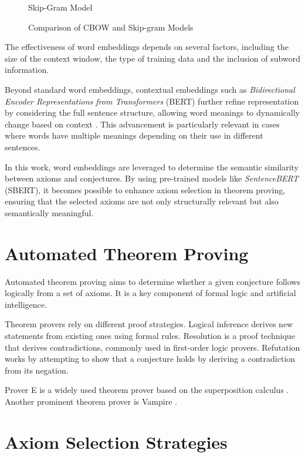 \documentclass[english,version-2020-11]{uzl-thesis}
\begin{document}
\begin{figure}[h]
\begin{subcaptionblock}{0.45\textwidth}
        \caption{Skip-Gram Model}
    \end{subcaptionblock}
    \caption{Comparison of CBOW and Skip-gram Models}
\end{figure}
\FloatBarrier

The effectiveness of word embeddings depends on several factors, including the size of the context window, the type of training data and the inclusion of subword information.

Beyond standard word embeddings, contextual embeddings such as \textit{Bidirectional Encoder Representations from Transformers} (BERT) further refine representation by considering the full sentence structure, allowing word meanings to dynamically change based on context \cite{Devlin2019}. This advancement is particularly relevant in cases where words have multiple meanings depending on their use in different sentences.

In this work, word embeddings are leveraged to determine the semantic similarity between axioms and conjectures. By using pre-trained models like \textit{SentenceBERT} (SBERT), it becomes possible to enhance axiom selection in theorem proving, ensuring that the selected axioms are not only structurally relevant but also semantically meaningful.

\section{Automated Theorem Proving}

Automated theorem proving aims to determine whether a given conjecture follows logically from a set of axioms. It is a key component of formal logic and artificial intelligence.

Theorem provers rely on different proof strategies. Logical inference derives new statements from existing ones using formal rules. Resolution is a proof technique that derives contradictions, commonly used in first-order logic provers. Refutation works by attempting to show that a conjecture holds by deriving a contradiction from its negation.

Prover E is a widely used theorem prover based on the superposition calculus \cite{Schulz2019}. Another prominent theorem prover is Vampire \cite{Riazanov2002}.

\section{Axiom Selection Strategies}
\end{document}
